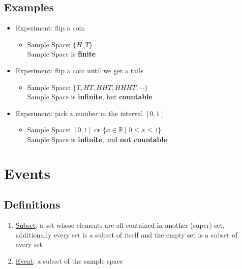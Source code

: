 \documentclass[12pt]{article}
\begin{document}
        \subsection{Examples}
            \begin{itemize}
                \item Experiment: flip a coin
                    \begin{itemize}
                        \item Sample Space: $\{H, T\}$
                        \\Sample Space is \textbf{finite}
                    \end{itemize}
                \item Experiment: flip a coin until we get a tails
                    \begin{itemize}
                        \item Sample Space: $\{T, HT, HHT, HHHT, \cdots\}$
                        \\Sample Space is \textbf{infinite}, but \textbf{countable}
                    \end{itemize}
                \item Experiment: pick a number in the interval $[0, 1]$
                    \begin{itemize}
                        \item Sample Space: $[0, 1]$ or $\{ x \in \mathbb{R} \mid 0 \leq x \leq 1 \}$
                        \\Sample Space is \textbf{infinite}, and \textbf{not countable}
                    \end{itemize}
            \end{itemize}
        
    \section{Events}
        \subsection{Definitions}
            \begin{enumerate}
                \item \underline{Subset}: a set whose elements are all contained in another (super) set, additionally every set is a subset of itself and the empty set is a subset of every set
                \item \underline{Event}: a subset of the sample space
    
            \end{enumerate}
\end{document}
